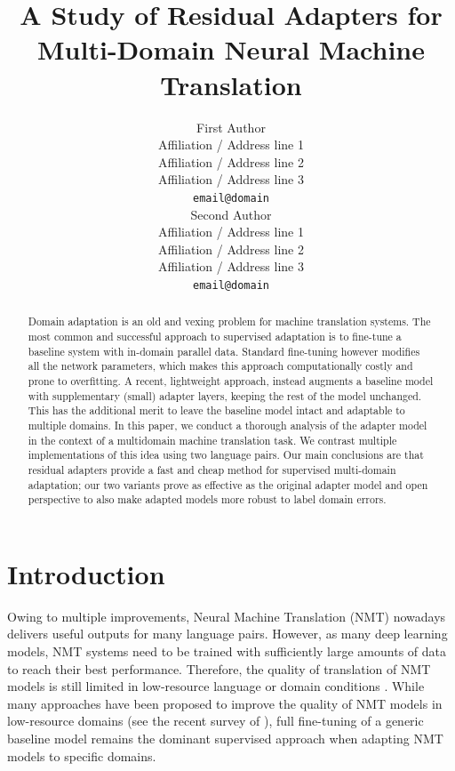 \documentclass[11pt,a4paper]{article}
\title{A Study of Residual Adapters for Multi-Domain Neural Machine Translation}
\author{First Author \\
  Affiliation / Address line 1 \\
  Affiliation / Address line 2 \\
  Affiliation / Address line 3 \\
  \texttt{email@domain} \\\And
  Second Author \\
  Affiliation / Address line 1 \\
  Affiliation / Address line 2 \\
  Affiliation / Address line 3 \\
  \texttt{email@domain} \\}
\date{}
\newcommand{\fyDone}[1]{\done[FY]\Todo[FY:]{\textcolor{orange}{#1}}}
\newcommand{\mpTodo}[1]{\Todo[MP:]{\textcolor{green}{#1}}}
\newcommand{\mpDone}[1]{\done[MP]\Todo[MP:]{\textcolor{green}{#1}}}
\begin{document}
\maketitle
\begin{abstract}
\fyDone{Citation-free abstract}
Domain adaptation is an old and vexing problem for machine translation systems. The most common and successful approach to supervised adaptation is to fine-tune a baseline system with in-domain parallel data. Standard fine-tuning however modifies all the network parameters, which makes this approach computationally costly and prone to overfitting. A recent, lightweight approach, instead augments a baseline model with supplementary (small) adapter layers, keeping the rest of the model unchanged. This has the additional merit to leave the baseline model intact and adaptable to multiple domains. In this paper, we conduct a thorough analysis of the adapter model in the context of a multidomain machine translation task. We contrast multiple implementations of this idea using two language pairs. Our main conclusions are that residual adapters provide a fast and cheap method for supervised multi-domain adaptation; our two variants prove as effective as the original adapter model and open perspective to also make adapted models more robust to label domain errors.
\fyDone{abstract to be continued}

\end{abstract}
\section{Introduction \label{sec:intro}}
\mpDone{write introduction} \fyDone{Citations in chronological order}\fyDone{Split long sentences}
Owing to multiple improvements, Neural Machine Translation (NMT) \cite{Kalchbrenner13recurrent,Sutskever14sequence,Bahdanau15learning,Vaswani17attention} nowadays delivers useful outputs for many language pairs. However, as many deep learning models, NMT systems need to be trained with sufficiently large amounts of data to reach their best performance. Therefore, the quality of translation of NMT models is still limited in low-resource language or domain conditions \cite{duh13adaptation,zoph16transfer,koehn17six}. While many approaches have been proposed to improve the quality of NMT models in low-resource domains (see the recent survey of \citet{Chu18asurvey}), full fine-tuning \cite{Luong15stanford,neubig18rapid} of a generic baseline model remains the dominant supervised approach when adapting NMT models to specific domains.
\end{document}
